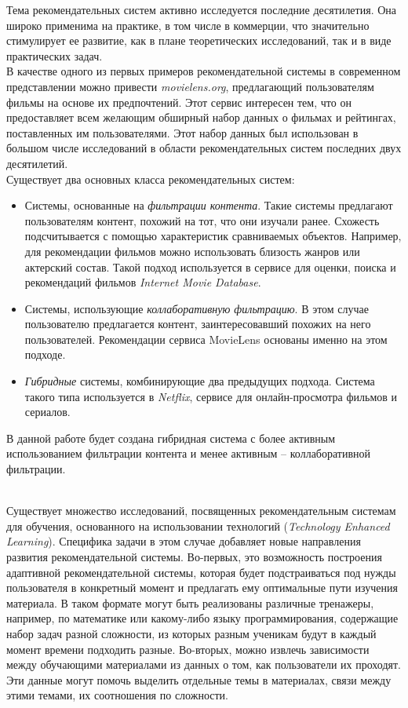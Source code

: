 \documentclass[14pt]{matmex-diploma}
\begin{document}
\indent Тема рекомендательных систем активно исследуется последние десятилетия\cite{goldberg1992using}\cite{Mahmood}\cite{Anand}. Она широко применима на практике, в том числе в коммерции, что значительно стимулирует ее развитие, как в плане теоретических исследований, так и в виде практических задач. 
\\\indent В качестве одного из первых примеров рекомендательной системы в современном представлении можно привести \textit{movielens.org}\cite{movielens}, предлагающий пользователям фильмы на основе их предпочтений. Этот сервис интересен тем, что он предоставляет всем желающим обширный набор данных о фильмах и рейтингах, поставленных им пользователями. Этот набор данных был использован в большом числе исследований в области рекомендательных систем последних двух десятилетий.  
\\\indent Существует два основных класса рекомендательных систем\cite{rec_sys_handbook}:
\begin{itemize}
    \item Системы, основанные на \textit{фильтрации контента}. Такие системы предлагают пользователям контент, похожий на тот, что они изучали ранее. Схожесть подсчитывается с помощью характеристик сравниваемых объектов. Например, для рекомендации фильмов можно использовать близость жанров или актерский состав. Такой подход используется в сервисе для оценки, поиска и рекомендаций фильмов \textit{Internet Movie Database}\cite{imdb}.
    \item Системы, использующие \textit{коллаборативную фильтрацию}. В этом случае пользователю предлагается контент, заинтересовавший похожих на него пользователей. Рекомендации сервиса MovieLens основаны именно на этом подходе.
    \item \textit{Гибридные} системы, комбинирующие два предыдущих подхода. Система такого типа используется в  \textit{Netflix}\cite{netflix}, сервисе для онлайн-просмотра фильмов и сериалов.
\end{itemize}

\indent В данной работе будет создана гибридная система с более активным использованием фильтрации контента и менее активным -- коллаборативной фильтрации.

\\\indent Существует множество исследований, посвященных рекомендательным системам для обучения, основанного на использовании технологий (\textit{Technology Enhanced
Learning})\cite{rec_sys_handbook:tel}. Специфика задачи в этом случае добавляет новые направления развития рекомендательной системы. Во-первых, это возможность построения адаптивной рекомендательной системы, которая будет подстраиваться под нужды пользователя в конкретный момент и предлагать ему оптимальные пути изучения материала\cite{adaptive}. В таком формате могут быть реализованы различные тренажеры, например, по математике или какому-либо языку программирования, содержащие набор задач разной сложности, из которых разным ученикам будут в каждый момент времени подходить разные. Во-вторых, можно извлечь зависимости между обучающими материалами из данных о том, как пользователи их проходят. Эти данные могут помочь выделить отдельные темы в материалах, связи между этими темами, их соотношения по сложности\cite{learning_networks}.
\end{document}
